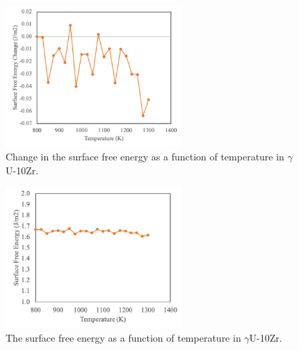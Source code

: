 \documentclass[review]{elsarticle}
\begin{document}
\begin{figure}[!htp]
\begin{center}
\includegraphics[width=0.6\textwidth]{free}
\end{center}
\caption{Change in the surface free energy as a function of temperature in $\gamma$U-10Zr.}
\label{fig:free}
\end{figure}

\begin{figure}[!htp]
\begin{center}
\includegraphics[width=0.6\textwidth]{freeT}
\end{center}
\caption{The surface free energy as a function of temperature in $\gamma$U-10Zr.}
\label{fig:freeT}
\end{figure}

\end{document}

